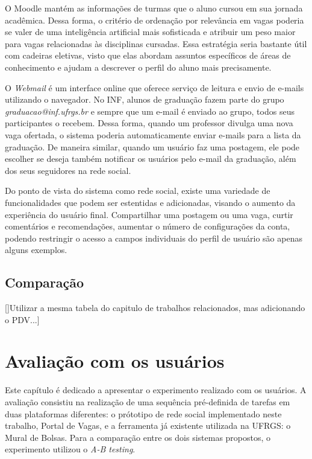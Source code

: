 \documentclass[cic,tc]{iiufrgs}
\begin{document}
O Moodle mantém as informações de turmas que o aluno cursou em sua jornada acadêmica. Dessa forma, o critério de ordenação por relevância em vagas poderia se valer de uma inteligência artificial mais sofisticada e atribuir um peso maior para vagas relacionadas às disciplinas cursadas. Essa estratégia seria bastante útil com cadeiras eletivas, visto que elas abordam assuntos específicos de áreas de conhecimento e ajudam a descrever o perfil do aluno mais precisamente. 

O \textit{Webmail} é um interface online que oferece serviço de leitura e envio de e-mails utilizando o navegador. No INF, alunos de graduação fazem parte do grupo \textit{graduacao@inf.ufrgs.br} e sempre que um e-mail é enviado ao grupo, todos seus participantes o recebem. Dessa forma, quando um professor divulga uma nova vaga ofertada, o sistema poderia automaticamente enviar e-mails para a lista da graduação. De maneira similar, quando um usuário faz uma postagem, ele pode escolher se deseja também notificar os usuários pelo e-mail da graduação, além dos seus seguidores na rede social.

Do ponto de vista do sistema como rede social, existe uma variedade de funcionalidades que podem ser estentidas e adicionadas, visando o aumento da experiência do usuário final. Compartilhar uma postagem ou uma vaga, curtir comentários e recomendações, aumentar o número de configurações da conta, podendo restringir o acesso a campos individuais do perfil de usuário são apenas alguns exemplos.

\section{Comparação}
\label{redeComparacao}

[]Utilizar a mesma tabela do capitulo de trabalhos relacionados, mas adicionando o PDV...]

\chapter{Avaliação com os usuários}
\label{Avaliação}

Este capítulo é dedicado a apresentar o experimento realizado com os usuários.  A avaliação consistiu na realização de uma sequência pré-definida de tarefas em duas plataformas diferentes: o prótotipo de rede social implementado neste trabalho, Portal de Vagas, e a ferramenta já existente utilizada na UFRGS: o Mural de Bolsas. Para a comparação entre os dois sistemas propostos, o experimento utilizou o \textit{A-B testing}. 
\end{document}
